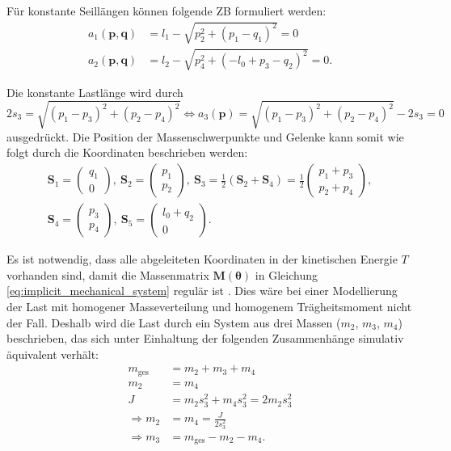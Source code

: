 Für konstante Seillängen können folgende ZB formuliert werden:
\begin{align}
	a_1(\mathbf{p}, \mathbf{q}) &= l_{1} - \sqrt{p_{2}^{2} + \left(p_{1} - q_{1}\right)^{2}} = 0\\
	a_2(\mathbf{p}, \mathbf{q}) &= l_{2} - \sqrt{p_{4}^{2} + \left(- l_{0} + p_{3} - q_{2}\right)^{2}} = 0.	
\end{align}

Die konstante Lastlänge wird durch
\begin{equation}
	2 s_{3} = \sqrt{\left(p_{1} - p_{3}\right)^{2} + \left(p_{2} - p_{4}\right)^{2}} \Leftrightarrow a_3(\mathbf{p}) = \sqrt{\left(p_{1} - p_{3}\right)^{2} + \left(p_{2} - p_{4}\right)^{2}} - 2 s_{3} = 0
\end{equation}
ausgedrückt. Die Position der Massenschwerpunkte und Gelenke kann somit wie folgt durch die Koordinaten beschrieben werden:
\begin{align}
	\mathbf{S}_1 =
	\begin{pmatrix}
		q_1 \\
		0
	\end{pmatrix}, 
	\
	\mathbf{S}_2 =
	\begin{pmatrix}
		p_1 \\
		p_2
	\end{pmatrix},
	\
	\mathbf{S}_3 =
	\frac{1}{2}(\mathbf{S}_2 + \mathbf{S}_4) =
	\frac{1}{2}
	\begin{pmatrix}
		p_1 + p_3 \\
		p_2 + p_4
	\end{pmatrix},
	\nonumber \\
	\mathbf{S}_4 =
	\left(\begin{matrix}
		p_3 \\
		p_4
	\end{matrix}\right),
	\
	\mathbf{S}_5 =
	\left(\begin{matrix}
		l_0 + q_2 \\
		0
	\end{matrix}\right).
\end{align}

Es ist notwendig, dass alle abgeleiteten Koordinaten in der kinetischen Energie $T$ vorhanden sind, damit die Massenmatrix $\mathbf{M}(\boldsymbol{\theta})$ in Gleichung \eqref{eq:implicit_mechanical_system} regulär ist \cite[${\text{S. 7}}$]{DissKnoll}. Dies wäre bei einer Modellierung der Last mit homogener Masseverteilung und homogenem Trägheitsmoment nicht der Fall. Deshalb wird die Last durch ein System aus drei Massen ($m_2$, $m_3$, $m_4$) beschrieben, das sich unter Einhaltung der folgenden Zusammenhänge simulativ äquivalent verhält:
\begin{subequations}
\begin{align}
	m_{\mathrm{ges}} &= m_2 + m_3 + m_4\\
	m_2 &= m_4\\
	J &= m_2 s_3^2 + m_4 s_3^2 = 2 m_2 s_3^2\\
	\Rightarrow m_2 &= m_4 = \frac{J}{2 s_3^2} \\
	\Rightarrow m_3 &= m_{\mathrm{ges}} - m_2 -m_4.
\end{align}
\end{subequations}

